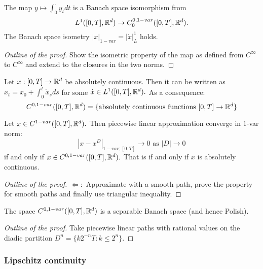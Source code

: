 \begin{proposition}\label{theo:1varL1}
    The map $y \mapsto \int_0^{\cdot} y_t dt$ is a Banach space isomorphism from 
    \begin{equation}
        L^1([0,T], \mathbb{R}^d) \rightarrow C_0^{0,1-var}([0,T], \mathbb{R}^d).
    \end{equation}
    The Banach space isometry $|x|_{1-var} = |\dot{x}|_L^1$ holds.
\end{proposition}
\begin{proof}[Outline of the proof]
    Show the isometric property of the map as defined from $C^{\infty}$ to $C^{\infty}$ and extend to the closures in the two norms. 
\end{proof}
\begin{proposition}
Let $x: [0,T] \rightarrow \mathbb{R}^d$ be absolutely continuous. Then it can be written as $x_t = x_0 + \int_0^t \dot{x}_s ds$ for some $\dot{x} \in L^1([0,T], \mathbb{R}^d).$ As a consequence:
\begin{equation}
    C^{0,1-var}([0,T], \mathbb{R}^d) = \{ \text{absolutely continuous functions } [0,T] \rightarrow \mathbb{R}^d \}
\end{equation}
\end{proposition}

\begin{corollary}
    Let $x \in C^{1-var}([0,T], \mathbb{R}^d).$ Then piecewise linear approximation converge in $1$-var norm:
    \begin{equation}
        |x - x^D|_{1-var; [0,T]} \rightarrow 0 \text{ as } |D| \rightarrow 0
    \end{equation}
    if and only if $x \in C^{0, 1-var}([0,T], \mathbb{R}^d).$ That is if and only if $x$ is absolutely continuous.
\end{corollary}
\begin{proof}[Outline of the proof]
    $\Leftarrow:$ Approximate  with a smooth path, prove the property for smooth paths and finally use triangular inequality.
\end{proof}

\begin{corollary}
 The space $C^{0,1-var}([0,T],\mathbb{R}^d)$ is a separable Banach space (and hence Polish).    
\end{corollary}
\begin{proof}[Outline of the proof]
    Take piecewise linear paths with rational values on the diadic partition $D^n = \{ k 2^{-n}T: k \leq 2^n \}.$
\end{proof}

\subsubsection{Lipschitz continuity}

